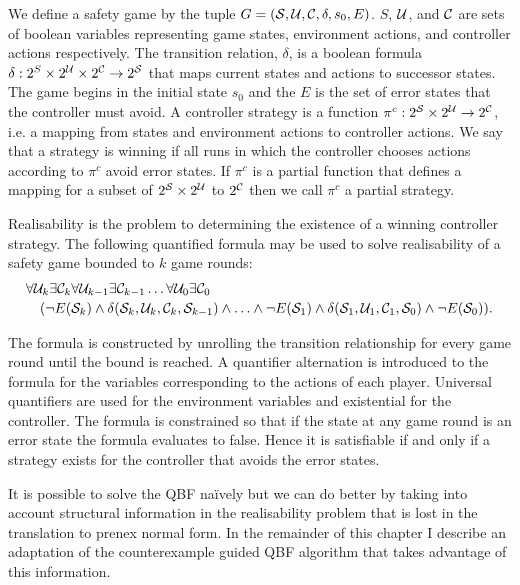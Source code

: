 We define a safety game by the tuple $G = (\mathcal{S}, \mathcal{U}, \mathcal{C}, \delta, s_0, E)$. $S$, $\mathcal{U}$, and $\mathcal{C}$ are sets of boolean variables representing game states, environment actions, and controller actions respectively. The transition relation, $\delta$, is a boolean formula $\delta : 2^{S} \times 2^{\mathcal{U}} \times 2^{\mathcal{C}} \to 2^{\mathcal{S}}$ that maps current states and actions to successor states. The game begins in the initial state $s_0$ and the $E$ is the set of error states that the controller must avoid.  A controller strategy is a function $\pi^c : 2^{\mathcal{S}} \times 2^{\mathcal{U}} \to 2^{\mathcal{C}}$, i.e. a mapping from states and environment actions to controller actions. We say that a strategy is winning if all runs in which the controller chooses actions according to $\pi^c$ avoid error states. If $\pi^c$ is a partial function that defines a mapping for a subset of $2^{\mathcal{S}} \times 2^{\mathcal{U}}$ to $2^{\mathcal{C}}$ then we call $\pi^c$ a partial strategy.

Realisability is the problem to determining the existence of a winning controller strategy.  The following quantified formula may be used to solve realisability of a safety game bounded to $k$ game rounds: 
\begin{equation*}
\begin{multlined}
    \forall \cU_k \exists \cC_k \forall \cU_{k-1} \exists \cC_{k-1} \ldots \forall \cU_0 \exists \cC_0 \\
    (\lnot E(\cS_k) \land \delta(\cS_k, \cU_k, \cC_k, \cS_{k-1}) \land \ldots \land \lnot E(\cS_1) \land \delta(\cS_1, \cU_1, \cC_1, \cS_0) \land \lnot E(\cS_0)).
\end{multlined}
\end{equation*}

The formula is constructed by unrolling the transition relationship for every game round until the bound is reached. A quantifier alternation is introduced to the formula for the variables corresponding to the actions of each player. Universal quantifiers are used for the environment variables and existential for the controller. The formula is constrained so that if the state at any game round is an error state the formula evaluates to false. Hence it is satisfiable if and only if a strategy exists for the controller that avoids the error states.

It is possible to solve the QBF na\"ively but we can do better by taking into account structural information in the realisability problem that is lost in the translation to prenex normal form. In the remainder of this chapter I describe an adaptation of the counterexample guided QBF algorithm that takes advantage of this information.

